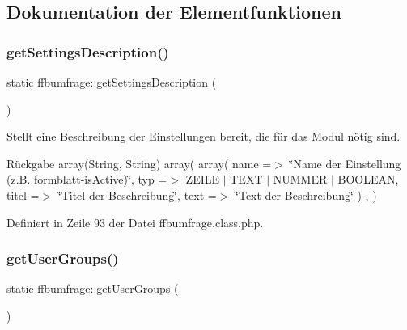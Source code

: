 \subsection{Dokumentation der Elementfunktionen}
\mbox{\label{classffbumfrage_a27ad7a611a7eea6e9fadd4c33764398d}} 
\subsubsection{\texorpdfstring{get\+Settings\+Description()}{getSettingsDescription()}}
{\footnotesize\ttfamily static ffbumfrage\+::get\+Settings\+Description (\begin{DoxyParamCaption}{ }\end{DoxyParamCaption})\hspace{0.3cm}{\ttfamily [static]}}

Stellt eine Beschreibung der Einstellungen bereit, die für das Modul nötig sind. \begin{DoxyReturn}{Rückgabe}
array(\+String, String) array( array( \textquotesingle{}name\textquotesingle{} =$>$ \char`\"{}\+Name der Einstellung (z.\+B. formblatt-\/is\+Active)\char`\"{}, \textquotesingle{}typ\textquotesingle{} =$>$ Z\+E\+I\+LE $\vert$ T\+E\+XT $\vert$ N\+U\+M\+M\+ER $\vert$ B\+O\+O\+L\+E\+AN, \textquotesingle{}titel\textquotesingle{} =$>$ \char`\"{}\+Titel der Beschreibung\char`\"{}, \textquotesingle{}text\textquotesingle{} =$>$ \char`\"{}\+Text der Beschreibung\char`\"{} ) , ) 
\end{DoxyReturn}


Definiert in Zeile 93 der Datei ffbumfrage.\+class.\+php.

\mbox{\label{classffbumfrage_ac1a0a07f9e073f2cb3a9a48b9391d74c}} 
\subsubsection{\texorpdfstring{get\+User\+Groups()}{getUserGroups()}}
{\footnotesize\ttfamily static ffbumfrage\+::get\+User\+Groups (\begin{DoxyParamCaption}{ }\end{DoxyParamCaption})\hspace{0.3cm}{\ttfamily [static]}}

